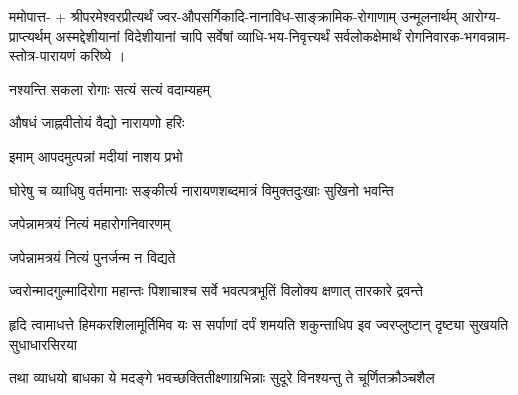 

ममोपात्त- + श्रीपरमेश्वरप्रीत्यर्थं ज्वर-औपसर्गिकादि-नानाविध-साङ्क्रामिक-रोगाणाम् उन्मूलनार्थम् आरोग्य-प्राप्त्यर्थम् अस्मद्देशीयानां विदेशीयानां चापि सर्वेषां व्याधि-भय-निवृत्त्यर्थं सर्वलोकक्षेमार्थं रोगनिवारक-भगवन्नाम-स्तोत्र-पारायणं करिष्ये ।


{नश्यन्ति सकला रोगाः सत्यं सत्यं वदाम्यहम्}

{औषधं जाह्नवीतोयं वैद्यो नारायणो हरिः}

{इमाम् आपदमुत्पन्नां मदीयां नाशय प्रभो}

{घोरेषु च व्याधिषु वर्तमानाः}
{सङ्कीर्त्य नारायणशब्दमात्रं}
{विमुक्तदुःखाः सुखिनो भवन्ति}

{जपेन्नामत्रयं नित्यं महारोगनिवारणम्}

{जपेन्नामत्रयं नित्यं पुनर्जन्म न विद्यते}

{ज्वरोन्मादगुल्मादिरोगा महान्तः}
{पिशाचाश्च सर्वे भवत्पत्रभूतिं}
{विलोक्य क्षणात् तारकारे द्रवन्ते}

{हृदि त्वामाधत्ते हिमकरशिलामूर्तिमिव यः}
{स सर्पाणां दर्पं शमयति शकुन्ताधिप इव}
{ज्वरप्लुष्टान् दृष्ट्या सुखयति सुधाधारसिरया}%

{तथा व्याधयो बाधका ये मदङ्गे}
{भवच्छक्तितीक्ष्णाग्रभिन्नाः सुदूरे}
{विनश्यन्तु ते चूर्णितक्रौञ्चशैल}

